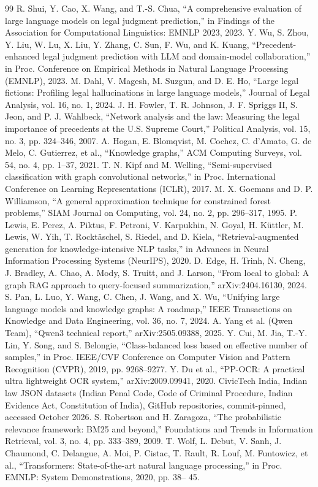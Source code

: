 \begin{thebibliography}{99}
 R. Shui, Y. Cao, X. Wang, and T.-S. Chua, ``A comprehensive evaluation of large language models on legal judgment prediction,'' in Findings of the Association for Computational Linguistics: EMNLP 2023, 2023.
 Y. Wu, S. Zhou, Y. Liu, W. Lu, X. Liu, Y. Zhang, C. Sun, F. Wu, and K. Kuang, ``Precedent-enhanced legal judgment prediction with LLM and domain-model collaboration,'' in Proc. Conference on Empirical Methods in Natural Language Processing (EMNLP), 2023.
 M. Dahl, V. Magesh, M. Suzgun, and D. E. Ho, ``Large legal fictions: Profiling legal hallucinations in large language models,'' Journal of Legal Analysis, vol. 16, no. 1, 2024.
 J. H. Fowler, T. R. Johnson, J. F. Spriggs II, S. Jeon, and P. J. Wahlbeck, ``Network analysis and the law: Measuring the legal importance of precedents at the U.S. Supreme Court,'' Political Analysis, vol. 15, no. 3, pp. 324--346, 2007.
 A. Hogan, E. Blomqvist, M. Cochez, C. d'Amato, G. de Melo, C. Gutierrez, et al., ``Knowledge graphs,'' ACM Computing Surveys, vol. 54, no. 4, pp. 1--37, 2021.
 T. N. Kipf and M. Welling, ``Semi-supervised classification with graph convolutional networks,'' in Proc. International Conference on Learning Representations (ICLR), 2017.
 M. X. Goemans and D. P. Williamson, ``A general approximation technique for constrained forest problems,'' SIAM Journal on Computing, vol. 24, no. 2, pp. 296--317, 1995.
 P. Lewis, E. Perez, A. Piktus, F. Petroni, V. Karpukhin, N. Goyal, H. K\"uttler, M. Lewis, W. Yih, T. Rockt\"aschel, S. Riedel, and D. Kiela, ``Retrieval-augmented generation for knowledge-intensive NLP tasks,'' in Advances in Neural Information Processing Systems (NeurIPS), 2020.
 D. Edge, H. Trinh, N. Cheng, J. Bradley, A. Chao, A. Mody, S. Truitt, and J. Larson, ``From local to global: A graph RAG approach to query-focused summarization,'' arXiv:2404.16130, 2024.
 S. Pan, L. Luo, Y. Wang, C. Chen, J. Wang, and X. Wu, ``Unifying large language models and knowledge graphs: A roadmap,'' IEEE Transactions on Knowledge and Data Engineering, vol. 36, no. 7, 2024.
 A. Yang et al. (Qwen Team), ``Qwen3 technical report,'' arXiv:2505.09388, 2025.
 Y. Cui, M. Jia, T.-Y. Lin, Y. Song, and S. Belongie, ``Class-balanced loss based on effective number of samples,'' in Proc. IEEE/CVF Conference on Computer Vision and Pattern Recognition (CVPR), 2019, pp. 9268--9277.
 Y. Du et al., ``PP-OCR: A practical ultra lightweight OCR system,'' arXiv:2009.09941, 2020.
 CivicTech India, Indian law JSON datasets (Indian Penal Code, Code of Criminal Procedure, Indian Evidence Act, Constitution of India), GitHub repositories, commit-pinned, accessed October 2026.
 S. Robertson and H. Zaragoza, ``The probabilistic relevance framework: BM25 and beyond,'' Foundations and Trends in Information Retrieval, vol. 3, no. 4, pp. 333--389, 2009.
 T. Wolf, L. Debut, V. Sanh, J. Chaumond, C. Delangue, A. Moi, P. Cistac, T. Rault, R. Louf, M. Funtowicz, et al., ``Transformers: State-of-the-art natural language processing,'' in Proc. EMNLP: System Demonstrations, 2020, pp. 38-- 45.
\end{thebibliography}
